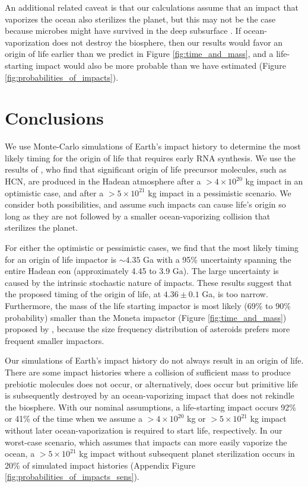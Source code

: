 \documentclass[manuscript]{aastex63}
\begin{document}
An additional related caveat is that our calculations assume that an impact that vaporizes the ocean also sterilizes the planet, but this may not be the case because microbes might have survived in the deep subsurface \citep{Sleep_1989,Grimm_2018}. If ocean-vaporization does not destroy the biosphere, then our results would favor an origin of life earlier than we predict in Figure \ref{fig:time_and_mass}, and a life-starting impact would also be more probable than we have estimated (Figure \ref{fig:probabilities_of_impacts}).

\section{Conclusions}

We use Monte-Carlo simulations of Earth's impact history to determine the most likely timing for the origin of life that requires early RNA synthesis. We use the results of \citet{Wogan_2023}, who find that significant origin of life precursor molecules, such as HCN, are produced in the Hadean atmosphere after a $> 4 \times 10^{20}$ kg impact in an optimistic case, and after a $> 5 \times 10^{21}$ kg impact in a pessimistic scenario. We consider both possibilities, and assume such impacts can cause life's origin so long as they are not followed by a smaller ocean-vaporizing collision that sterilizes the planet.

For either the optimistic or pessimistic cases, we find that the most likely timing for an origin of life impactor is $\sim 4.35$ Ga with a 95\% uncertainty spanning the entire Hadean eon (approximately 4.45 to 3.9 Ga). The large uncertainty is caused by the intrinsic stochastic nature of impacts. These results suggest that the \citet{Benner_2020} proposed timing of the origin of life, at $4.36 \pm 0.1$ Ga, is too narrow. Furthermore, the mass of the life starting impactor is most likely (69\% to 90\% probability) smaller than the Moneta impactor (Figure \ref{fig:time_and_mass}) proposed by \citet{Benner_2020}, because the size frequency distribution of asteroids prefers more frequent smaller impactors.

Our simulations of Earth's impact history do not always result in an origin of life. There are some impact histories where a collision of sufficient mass to produce prebiotic molecules does not occur, or alternatively, does occur but primitive life is subsequently destroyed by an ocean-vaporizing impact that does not rekindle the biosphere. With our nominal assumptions, a life-starting impact occurs 92\% or 41\% of the time when we assume a $> 4 \times 10^{20}$ kg or $> 5 \times 10^{21}$ kg impact without later ocean-vaporization is required to start life, respectively. In our worst-case scenario, which assumes that impacts can more easily vaporize the ocean, a $> 5 \times 10^{21}$ kg impact without subsequent planet sterilization occurs in 20\% of simulated impact histories (Appendix Figure \ref{fig:probabilities_of_impacts_sens}).
\end{document}
